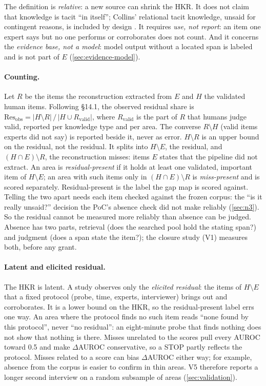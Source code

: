 The definition is \emph{relative}: a new source can shrink the HKR. It does not claim that
knowledge is tacit \enquote{in itself}; Collins' relational tacit knowledge, unsaid for contingent
reasons, is included by design \parencite{collins2010tacit}. It requires \emph{use, not report}: an
item one expert says but no one performs or corroborates does not count. And it concerns the
\emph{evidence base, not a model}: model output without a located span is labeled
 and is not part of $E$ (\cref{sec:evidence-model}).

\paragraph{Counting.} Let $R$ be the items the reconstruction extracted from $E$ and $H$ the
validated human items. Following  §14.1, the observed residual share is
$\mathrm{Res}_{\mathrm{obs}} = |H \setminus R| \,/\, |H \cup R_{\mathrm{valid}}|$, where
$R_{\mathrm{valid}}$ is the part of $R$ that humans judge valid, reported per knowledge type and per
area. The converse $R \setminus H$ (valid items experts did not say) is reported beside it, never as
error. \evint{} $H \setminus R$ is an upper bound on the residual, not the residual. It splits into
$H \setminus E$, the residual, and $(H \cap E) \setminus R$, the reconstruction misses: items $E$
states that the pipeline did not extract. An area is \emph{residual-present} if it holds at least one
validated, important item of $H \setminus E$; an area with such items only in
$(H \cap E) \setminus R$ is \emph{miss-present} and is scored separately. Residual-present is the
label the gap map is scored against. Telling the two apart needs each item checked against the
frozen corpus: the \enquote{is it really unsaid?} decision the PoC's absence check did not make
reliably (\cref{sec:n3}). So the residual cannot be measured more reliably than absence can be
judged. Absence has two parts, retrieval (does the searched pool hold the stating span?) and
judgment (does a span state the item?); the closure study (V1) measures both, before any grant.

\paragraph{Latent and elicited residual.} \evint{} The HKR is latent. A study observes only the
\emph{elicited residual}: the items of $H \setminus E$ that a fixed protocol (probe, time, experts,
interviewer) brings out and corroborates. It is a lower bound on the HKR, so the residual-present label
errs one way. An area where the protocol finds no such item reads \enquote{none found by this
protocol}, never \enquote{no residual}: an eight-minute probe that finds nothing does not show that
nothing is there. Misses unrelated to the scores pull every AUROC toward 0.5 and make $\Delta$AUROC
conservative, so a STOP partly reflects the protocol. Misses related to a score can bias $\Delta$AUROC
either way; for example, absence from the corpus is easier to confirm in thin areas. V5 therefore
reports a longer second interview on a random subsample of areas (\cref{sec:validation}).

